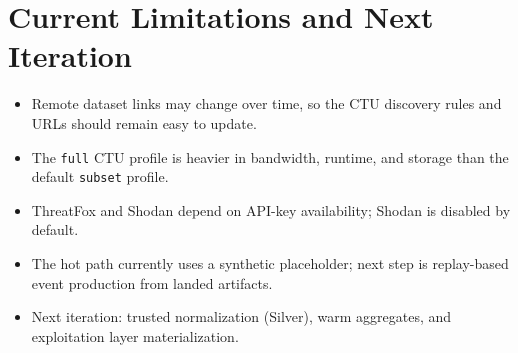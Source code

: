 \documentclass[11pt,a4paper]{article}
\begin{document}
\section{Current Limitations and Next Iteration}
\begin{itemize}[leftmargin=1.5em]
  \item Remote dataset links may change over time, so the CTU discovery rules and URLs should remain easy to update.
  \item The \texttt{full} CTU profile is heavier in bandwidth, runtime, and storage than the default \texttt{subset} profile.
  \item ThreatFox and Shodan depend on API-key availability; Shodan is disabled by default.
  \item The hot path currently uses a synthetic placeholder; next step is replay-based event production from landed artifacts.
  \item Next iteration: trusted normalization (Silver), warm aggregates, and exploitation layer materialization.
\end{itemize}
\end{document}
